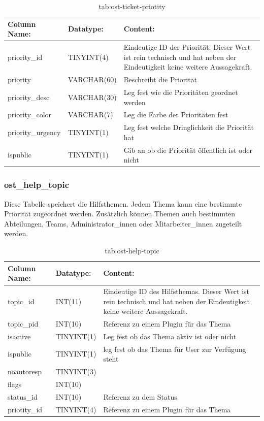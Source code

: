 \begin{table}[h]
	\begin{tabular}{|p{3.5cm}|p{4cm}|p{6.2cm}|}
		\hline
		\textbf{Column Name:} & \textbf{Datatype:} & \textbf{Content:}\\
		\hline
		priority\_id & TINYINT(4) & Eindeutige ID der Priorität. Dieser Wert ist rein technisch und hat  neben der Eindeutigkeit keine weitere Aussagekraft.\\
		\hline
		priority & VARCHAR(60) & Beschreibt die Priorität\\
		\hline
		priority\_desc & VARCHAR(30) & Leg fest wie die Prioritäten geordnet werden \\
		\hline
		priority\_color & VARCHAR(7) & Leg die Farbe der Prioritäten fest\\
		\hline
		priority\_urgency & TINYINT(1) & Leg fest welche Dringlichkeit die Priorität hat \\
		\hline
		ispublic & TINYINT(1) & Gib an ob die Priorität öffentlich ist oder nicht\\
		\hline
	\end{tabular}
	\caption{tab:ost-ticket-priotity}
\end{table}
\label{tab:ost_ticket_priotity}

\newpage

\subsubsection{ost\_help\_topic}

Diese Tabelle speichert die Hilfsthemen. Jedem Thema kann eine bestimmte Priorität zugeordnet werden. Zusätzlich können Themen auch bestimmten Abteilungen, Teams, Administrator\_innen oder Mitarbeiter\_innen zugeteilt werden.   

\begin{table}[h]
	\begin{tabular}{|p{3.5cm}|p{4cm}|p{6.2cm}|}
		\hline
		\textbf{Column Name:} & \textbf{Datatype:} & \textbf{Content:}\\
		\hline
		topic\_id & INT(11) & Eindeutige ID des Hilfsthemas. Dieser Wert ist rein technisch und hat  neben der Eindeutigkeit keine weitere Aussagekraft.\\
		\hline
		topic\_pid & INT(10) & Referenz zu einem Plugin für das Thema\\
		\hline
		isactive & TINYINT(1) & Leg fest ob das Thema aktiv ist oder nicht \\
		\hline
		ispublic & TINYINT(1) & leg fest ob das Thema für User zur Verfügung steht\\
		\hline
		noautoresp & TINYINT(3) & \\
		\hline
		flags & INT(10) & \\
		\hline
		status\_id & INT(10) & Referenz zu dem Status \\
		\hline
		priotity\_id & TINYINT(4) & Referenz zu einem Plugin für das Thema\\
		\hline
			\end{tabular}
			\caption{tab:ost-help-topic}
		\end{table}
		\label{tab:ost_help_topic}
		\newpage
		
